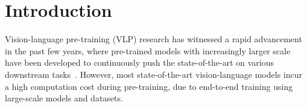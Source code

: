 \vspace{-2ex}
\section{Introduction}
\vspace{-0.5ex}
\label{sec:intro}




Vision-language pre-training (VLP) research has witnessed a rapid advancement in the past few years,
where pre-trained models with increasingly larger scale have been developed to continuously push the state-of-the-art on various downstream tasks~\cite{clip,ALBEF,blip,ofa,flamingo,beit3}.
However, most state-of-the-art vision-language models incur a high computation cost during pre-training, due to
end-to-end training using large-scale models and datasets.


